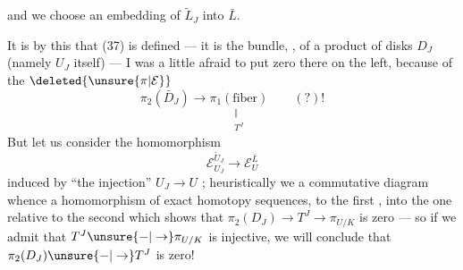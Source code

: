 
and we choose an embedding of $\tilde L_J$ into $\bar L$.

It is by this that (37) is defined --- it is the  bundle, , of a product of disks  $D_J$ (namely $U_J$ itself) --- I was a little afraid to put  zero there on the left, because of the $\deleted{\unsure{\pi|\mathcal E}}$
\[
\pi_2(\bar D_J)\longrightarrow
\underset{\substack{\Vert\\ T^J}}{\pi_1(\text{fiber})}
\qquad (?)!
\]
But let us consider the homomorphism
\[
\mathcal E_{U_J}^{\tilde U_J}\longrightarrow\mathcal E_U^{\bar L}
\]
induced by ``the injection'' $U_J\longrightarrow U$ ;  heuristically we  a commutative diagram 
whence a homomorphism of exact homotopy sequences,  to the first , into the one relative to the second
which shows that  $\pi_2(D_J)\longrightarrow T^J\longrightarrow\pi_{U/K}$ is zero --- so if we admit that $T^J\unsure{-|\to}\pi_{U/K}$ is injective, we will conclude that $\pi_2(D_J)\unsure{-|\to}T^J$ is zero!

